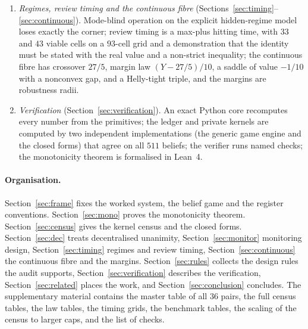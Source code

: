 \begin{enumerate}[leftmargin=2em,itemsep=1pt]
\item \emph{Regimes, review timing and the continuous fibre} (Sections~\ref{sec:timing}--\ref{sec:continuous}). Mode-blind operation on the explicit hidden-regime model loses exactly the corner; review timing is a max-plus hitting time, with $33$ and $43$ viable cells on a $93$-cell grid and a demonstration that the identity must be stated with the real value and a non-strict inequality; the continuous fibre has crossover $27/5$, margin law $(Y-27/5)/10$, a saddle of value $-1/10$ with a nonconvex gap, and a Helly-tight triple, and the margins are robustness radii.
\item \emph{Verification} (Section~\ref{sec:verification}). An exact Python core recomputes every number from the primitives; the ledger and private kernels are computed by two independent implementations (the generic game engine and the closed forms) that agree on all $511$ beliefs; the verifier runs \NCHECKS{} named checks; the monotonicity theorem is formalised in Lean~4.
\end{enumerate}

\paragraph{Organisation.}
Section~\ref{sec:frame} fixes the worked system, the belief game and the register conventions. Section~\ref{sec:mono} proves the monotonicity theorem. Section~\ref{sec:census} gives the kernel census and the closed forms. Section~\ref{sec:dec} treats decentralised unanimity, Section~\ref{sec:monitor} monitoring design, Section~\ref{sec:timing} regimes and review timing, Section~\ref{sec:continuous} the continuous fibre and the margins. Section~\ref{sec:rules} collects the design rules the audit supports, Section~\ref{sec:verification} describes the verification, Section~\ref{sec:related} places the work, and Section~\ref{sec:conclusion} concludes. The supplementary material contains the master table of all $36$ pairs, the full census tables, the law tables, the timing grids, the benchmark tables, the scaling of the census to larger caps, and the list of checks.
